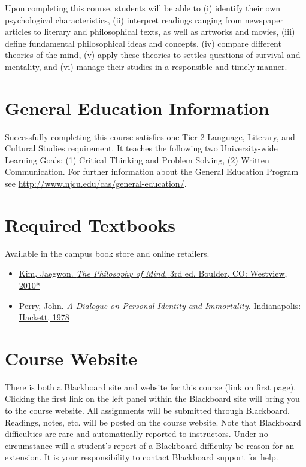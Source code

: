 \documentclass[article,oneside]{memoir}
\begin{document}
Upon completing this course, students will be able to  (i) identify their own psychological characteristics, (ii) interpret readings ranging from newspaper articles to literary and philosophical texts, as well as artworks and movies, (iii) define fundamental philosophical ideas and concepts, (iv) compare different theories of the mind, (v) apply these theories to settles questions of survival and mentality,  and  (vi) manage their studies in a responsible and timely manner. 





\section{General Education Information} 
Successfully completing this course satisfies one Tier 2 Language, Literary, and Cultural Studies requirement. It teaches the following two University-wide Learning Goals: (1) Critical Thinking and Problem Solving, (2) Written Communication. For further information about the General Education Program see \href{http://www.njcu.edu/cas/general-education/}{http://www.njcu.edu/cas/general-education/}.


\section{Required Textbooks}
Available in the campus book store and online retailers.


\begin{itemize}
\item \href{https://www.amazon.com/Philosophy-Mind-Jaegwon-Kim/dp/0813344581/ref=sr_1_1?ie=UTF8&qid=1484684648&sr=8-1&keywords=kim+philosophy+of+mind}{Kim, Jaegwon. \emph{The Philosophy of Mind.} 3rd ed. Boulder, CO: Westview, 2010*}
\item \href{https://www.amazon.com/Dialogue-Personal-Immortality-Philosophical-Dialogues/dp/0915144530/ref=sr_1_1?ie=UTF8&qid=1484684753&sr=8-1&keywords=john+perry}{Perry, John. \emph{A Dialogue on Personal Identity and Immortality.}  Indianapolis: Hackett, 1978}  
\end{itemize}


\section{Course Website}
There is both a Blackboard site and website for this course (link on first page). Clicking the first link on the left panel within the Blackboard site will bring you to the course website. All assignments will be submitted through Blackboard. Readings, notes, etc. will be posted on the course website. Note that Blackboard difficulties are rare and automatically reported to instructors. Under no circumstance will a student's report of a Blackboard difficulty be reason for an extension. It is your responsibility to contact Blackboard support for help.
\end{document}
